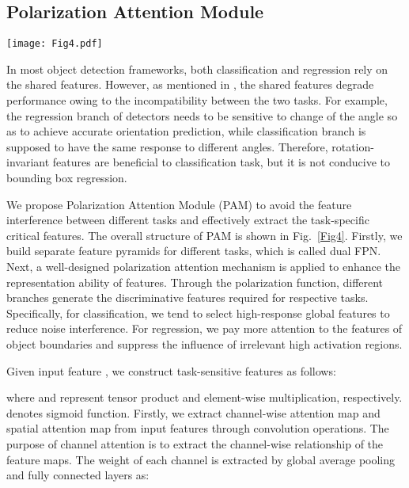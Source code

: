 \documentclass[journal]{IEEEtran}
\begin{document}
\subsection{Polarization Attention Module}

\begin{figure*}[t]
	\centering
	\texttt{[image: Fig4.pdf]} 
	\caption{Illustration of the PAM module. SA denotes spatial attention, CA represents channel-wise attention.}
	\label{Fig4}
\end{figure*}

In most object detection frameworks, both classification and regression rely on the shared features. However, as mentioned in \cite{liao2018rotation, song2020revisiting}, the shared features degrade performance owing to the incompatibility between the two tasks. For example, the regression branch of detectors needs to be sensitive to change of the angle so as to achieve accurate orientation prediction, while classification branch is supposed to have the same response to different angles. Therefore, rotation-invariant features are beneficial to classification task, but it is not conducive to bounding box regression.

We propose Polarization Attention Module (PAM) to avoid the feature interference between different tasks and effectively extract the task-specific critical features. The overall structure of PAM is shown in Fig.~\ref{Fig4}. Firstly, we build separate feature pyramids for different tasks, which is called dual FPN. Next, a well-designed polarization attention mechanism is applied to enhance the representation ability of features. Through the polarization function, different branches generate the discriminative features required for respective tasks. Specifically, for classification, we tend to select high-response global features to reduce noise interference. For regression, we pay more attention to the features of object boundaries and suppress the influence of irrelevant high activation regions. 

Given input feature , we construct task-sensitive features as follows:

where  and  represent tensor product and element-wise multiplication, respectively.  denotes sigmoid function. Firstly, we extract channel-wise attention map  and spatial attention map  from input features through convolution operations. The purpose of channel attention is to extract the channel-wise relationship of the feature maps. The weight of each channel is extracted by global average pooling and fully connected layers as:
\end{document}
